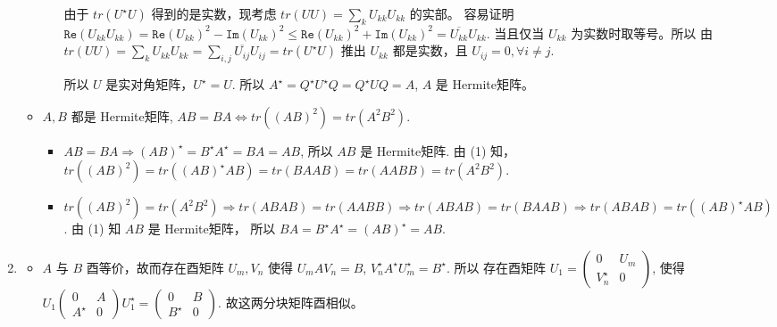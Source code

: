 \documentclass{article}
\begin{document}
\begin{spacing}{1.5}
\begin{enumerate}
\begin{itemize}
\begin{itemize}
            由于 $tr(U^\star U)$ 得到的是实数，现考虑 $tr(UU) = \sum_{k} U_{kk}U_{kk}$ 的实部。
            容易证明 $\mathtt{Re}(U_{kk}U_{kk}) = \mathtt{Re}(U_{kk})^2 - \mathtt{Im}(U_{kk})^2 \leq \mathtt{Re}(U_{kk})^2 + \mathtt{Im}(U_{kk})^2 = \overline{U_{kk}}U_{kk}$.
            当且仅当 $U_{kk}$ 为实数时取等号。所以 由 $tr(UU) = \sum_{k} U_{kk}U_{kk} = \sum_{i,j}\overline{U_{ij}}U_{ij} = tr(U^\star U)$ 推出 $U_{kk}$ 都是实数，且 $U_{ij}=0, \forall i\ne j$.

            所以 $U$ 是实对角矩阵，$U^\star = U$. 所以 $A^\star = Q^\star U^\star Q = Q^\star U Q = A$, $A$ 是 Hermite矩阵。

        \end{itemize}
        \item [(2)] $A, B$ 都是 Hermite矩阵, $AB = BA \Leftrightarrow tr((AB)^2) = tr(A^2B^2)$.
        \begin{itemize}
            \item [$\Rightarrow$:] $AB = BA \Rightarrow (AB)^\star = B^\star A^\star = BA = AB$, 所以 $AB$ 是 Hermite矩阵. 由 (1) 知，$tr((AB)^2) = tr((AB)^\star AB) = tr(BAAB) = tr(AABB) = tr(A^2B^2)$.
            \item [$\Leftarrow$:] $tr((AB)^2) = tr(A^2B^2) \Rightarrow tr(ABAB) = tr(AABB) \Rightarrow tr(ABAB) = tr(BAAB) \Rightarrow tr(ABAB) = tr((AB)^\star AB)$. 由 (1) 知 $AB$ 是 Hermite矩阵，
            所以 $BA = B^\star A^\star = (AB)^\star = AB$. 
        \end{itemize}
    \end{itemize}

    \item [2.5 习题2]
        
        \begin{itemize}
            \item [$\Rightarrow$:]
            
            $A$ 与 $B$ 酉等价，故而存在酉矩阵 $U_m, V_n$ 使得 $U_m A V_n = B$, $V_n^\star A^\star U_m^\star = B^\star$. 所以 存在酉矩阵 
            $U_1 = \left(\begin{array}{cc}0&U_m\\V_n^\star&0\end{array}\right)$, 使得 
            $U_1 \left(\begin{array}{cc}0&A\\A^\star&0\end{array}\right) U_1^\star = \left(\begin{array}{cc}0&B\\B^\star&0\end{array}\right)$.
            故这两分块矩阵酉相似。


\end{itemize}
\end{enumerate}
\end{spacing}
\end{document}
